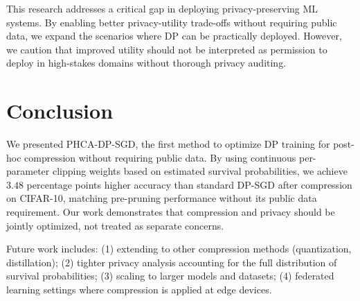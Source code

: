 \documentclass[11pt,a4paper]{article}
\begin{document}
This research addresses a critical gap in deploying privacy-preserving ML systems. By enabling better privacy-utility trade-offs without requiring public data, we expand the scenarios where DP can be practically deployed. However, we caution that improved utility should not be interpreted as permission to deploy in high-stakes domains without thorough privacy auditing.

\section{Conclusion}

We presented PHCA-DP-SGD, the first method to optimize DP training for post-hoc compression without requiring public data. By using continuous per-parameter clipping weights based on estimated survival probabilities, we achieve $3.48$ percentage points higher accuracy than standard DP-SGD after compression on CIFAR-10, matching pre-pruning performance without its public data requirement. Our work demonstrates that compression and privacy should be jointly optimized, not treated as separate concerns.

Future work includes: (1) extending to other compression methods (quantization, distillation); (2) tighter privacy analysis accounting for the full distribution of survival probabilities; (3) scaling to larger models and datasets; (4) federated learning settings where compression is applied at edge devices.
\end{document}
